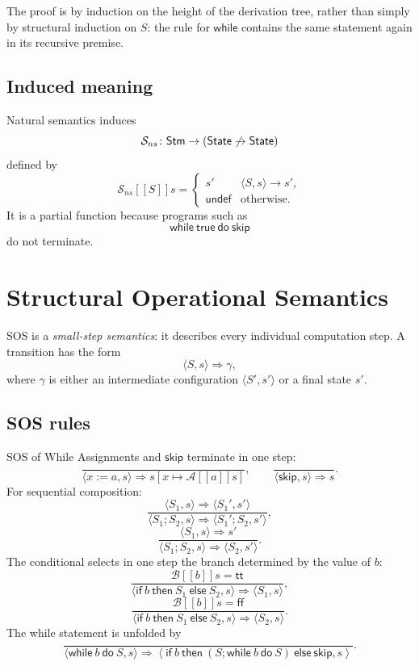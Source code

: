 \documentclass[a4paper]{article}
\newcommand{\State}{\mathsf{State}}
\newcommand{\Stm}{\mathsf{Stm}}
\newcommand{\undefined}{\mathsf{undef}}
\newcommand{\ttt}{\mathsf{tt}}
\newcommand{\fff}{\mathsf{ff}}
\newcommand{\skipc}{\mathsf{skip}}
\newcommand{\sem}[1]{[\![#1]\!]}
\begin{document}
The proof is by induction on the height of the derivation tree, rather than simply by structural induction on \(S\): the rule for \(\mathsf{while}\) contains the same statement again in its recursive premise.

\subsection{Induced meaning}

Natural semantics induces
\[
    \mathcal S_{ns}\colon\Stm\fromto(\State\not\to\State)
\]
defined by
\[
    \mathcal S_{ns}\sem{S}s
    =
    \begin{cases}
        s' & \langle S,s\rangle\to s',\\
        \undefined & \text{otherwise}.
    \end{cases}
\]
It is a partial function because programs such as
\[
    \mathsf{while}\ \mathsf{true}\ \mathsf{do}\ \skipc
\]
do not terminate.

\section{Structural Operational Semantics}

SOS is a \emph{small-step semantics}: it describes every individual computation step.
A transition has the form
\[
    \langle S,s\rangle\Rightarrow\gamma,
\]
where \(\gamma\) is either an intermediate configuration \(\langle S',s'\rangle\) or a final state \(s'\).

\subsection{SOS rules}

\begin{snippetdefinition}{SOS of While}
    Assignments and \(\skipc\) terminate in one step:
    \[
        \frac{}{\langle x:=a,s\rangle\Rightarrow s[x\mapsto\mathcal A\sem{a}s]},
        \qquad
        \frac{}{\langle\skipc,s\rangle\Rightarrow s}.
    \]
    For sequential composition:
    \[
        \frac{\langle S_1,s\rangle\Rightarrow\langle S_1',s'\rangle}
        {\langle S_1;S_2,s\rangle\Rightarrow\langle S_1';S_2,s'\rangle},
    \]
    \[
        \frac{\langle S_1,s\rangle\Rightarrow s'}
        {\langle S_1;S_2,s\rangle\Rightarrow\langle S_2,s'\rangle}.
    \]
    The conditional selects in one step the branch determined by the value of \(b\):
    \[
        \frac{\mathcal B\sem{b}s=\ttt}
        {\langle\mathsf{if}\ b\ \mathsf{then}\ S_1\ \mathsf{else}\ S_2,s\rangle
        \Rightarrow\langle S_1,s\rangle},
    \]
    \[
        \frac{\mathcal B\sem{b}s=\fff}
        {\langle\mathsf{if}\ b\ \mathsf{then}\ S_1\ \mathsf{else}\ S_2,s\rangle
        \Rightarrow\langle S_2,s\rangle}.
    \]
    The while statement is unfolded by
    \[
        \frac{}{
        \langle\mathsf{while}\ b\ \mathsf{do}\ S,s\rangle
        \Rightarrow
        \left\langle
        \mathsf{if}\ b\ \mathsf{then}\ (S;\mathsf{while}\ b\ \mathsf{do}\ S)\ \mathsf{else}\ \skipc,
        s\right\rangle}.
    \]
\end{snippetdefinition}
\end{document}
